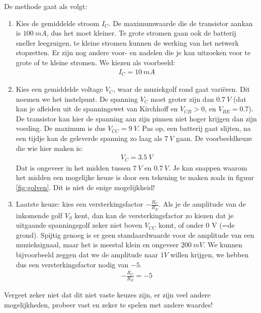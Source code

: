 \documentclass{article}
\begin{document}
				De methode gaat als volgt:
				\begin{enumerate}
					\item Kies de gemiddelde stroom $I_C$. De maximumwaarde die de transistor aankan is $100~mA$, dus het moet kleiner. Te grote stromen gaan ook de batterij sneller leegzuigen, te kleine stromen kunnen de werking van het netwerk stopzetten. Er zijn nog  andere voor- en nadelen die je kan uitzoeken voor te grote of te kleine stromen. We kiezen als voorbeeld:
					\begin{align}
					    I_C = 10~mA
					\end{align}

					\item Kies een gemiddelde voltage $V_C$, waar de muziekgolf rond gaat vari\"eren. Dit noemen we het instelpunt. De spanning $V_C$ moet groter zijn dan $0.7~V$ (dat kan je afleiden uit de spanningswet van Kirchhoff en  $V_{CB} > 0$, en $V_{BE} = 0.7$). De transistor kan hier de spanning aan zijn pinnen niet hoger krijgen dan zijn voeding. De maximum is dus $V_{CC} = 9~V$. Pas op, een batterij gaat slijten, na een tijdje kan de geleverde spanning zo laag als $7~V$ gaan. De voorbeeldkeuze die wie hier maken is:
					\begin{align}
					    V_C =  3.5~V
					\end{align}
					 Dat is ongeveer in het midden tussen $7~V$ en $0.7~V$. Je kan snappen waarom het midden een mogelijke keuze is door een tekening te maken zoals in figuur \ref{fig:golven}. Dit is niet de enige mogelijkheid!

					\item Laatste keuze: kies een versterkingsfactor $- \frac{R_C}{R_E}$. Als je de amplitude van de inkomende golf $V_S$ kent, dan kan de versterkingsfactor zo kiezen dat je uitgaande spanningsgolf zeker niet boven $V_{CC}$ komt, of onder $0$ V (=de grond). Spijtig genoeg is er geen standaardwaarde voor de amplitude van een muzieksignaal, maar het is meestal klein en ongeveer  $200~mV$. We kunnen bijvoorbeeld zeggen dat we de amplitude naar $1V$ willen krijgen, we hebben dus een versterkingsfactor nodig van $-5$.
					\begin{align}
					    -\frac{R_C}{R_E} = -5
					\end{align}
				\end{enumerate}

				Vergeet zeker niet dat dit niet vaste keuzes zijn, er zijn veel andere mogelijkheden, probeer vast en zeker te spelen met andere waardes!
\end{document}
